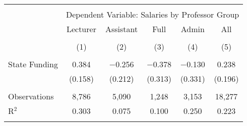 
\begin{tabular}{@{\extracolsep{5pt}}lccccc} 
\\[-1.8ex]\hline 
\hline \\[-1.8ex] 
 & \multicolumn{5}{c}{Dependent Variable: Salaries by Professor Group} \\ 
\cline{2-6} 
 & Lecturer & Assistant & Full & Admin & All \\ 
\\[-1.8ex] & (1) & (2) & (3) & (4) & (5)\\ 
\hline \\[-1.8ex] 
 State Funding & 0.384 & $-$0.256 & $-$0.378 & $-$0.130 & 0.238 \\ 
  & (0.158) & (0.212) & (0.313) & (0.331) & (0.196) \\ 
 \hline \\[-1.8ex] 
Observations & 8,786 & 5,090 & 1,248 & 3,153 & 18,277 \\ 
R$^{2}$ & 0.303 & 0.075 & 0.100 & 0.250 & 0.223 \\ 
\hline 
\hline \\[-1.8ex] 
\end{tabular} 
